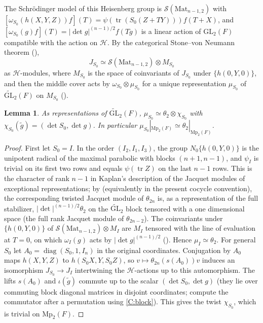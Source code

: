 \documentclass[11pt,oneside,notitlepage]{book}
\numberwithin{equation}{section}
\theoremstyle{plain}
\newtheorem{lemma}[theorem]{Lemma}
\theoremstyle{definition}
\newcommand{\GL}{\mathrm{GL}}
\newcommand{\Mp}{\mathrm{Mp}}
\newcommand{\Mat}{\mathrm{Mat}}
\newcommand{\cS}{\mathcal{S}}
\newcommand{\tGL}{\widetilde{\GL}}
\newcommand{\tr}{\operatorname{tr}}
\newcommand{\diag}{\operatorname{diag}}
\newcommand{\hil}[2]{(#1,#2)}
\begin{document}
The Schr\"odinger model of this Heisenberg group is $\cS(\Mat_{n-1,2})$ with $[\omega_{S_0}(h(X,Y,Z))f](T)=\psi(\tr(S_0(Z+TY)))f(T+X)$, and $[\omega_{S_0}(g)f](T)=|\det g|^{(n-1)/2}f(Tg)$ is a linear action of $\GL_2(F)$ compatible with the action on $\mathcal H$. By the categorical Stone--von Neumann theorem (),
\[J_{S_0}\simeq\cS(\Mat_{n-1,2})\otimes M_{S_0}\]
as $\mathcal H$-modules, where $M_{S_0}$ is the space of coinvariants of $J_{S_0}$ under $\{h(0,Y,0)\}$, and then the middle cover acts by $\omega_{S_0}\otimes\mu_{S_0}$ for a unique representation $\mu_{S_0}$ of $\tGL_2(F)$ on $M_{S_0}$ ().

\begin{lemma}\label{lem:Mmodule}
	As representations of $\tGL_2(F)$, $\mu_{S_0}\simeq\theta_2\otimes\chi_{S_0}$ with $\chi_{S_0}(\tilde g)=\hil{\det S_0}{\det g}$. In particular $\mu_{S_0}|_{\Mp_2(F)}\simeq\theta_2|_{\Mp_2(F)}$.
\end{lemma}
\begin{proof}
	First let $S_0=I$. In the order $(I_2,I_1,I_3)$, the group $N_0\{h(0,Y,0)\}$ is the unipotent radical of the maximal parabolic with blocks $(n+1,n-1)$, and $\psi_{I}$ is trivial on its first two rows and equals $\psi(\tr Z)$ on the last $n-1$ rows. This is the character of rank $n-1$ in Kaplan's description of the Jacquet modules of exceptional representations; by \cite[Theorem 3.3]{Kaplan} (equivalently \cite[Theorem 4.5]{KM} in the present cocycle convention), the corresponding twisted Jacquet module of $\theta_{2n}$ is, as a representation of the full stabilizer, $|\det|^{(n-1)/2}\theta_2$ on the $\tGL_2$ block tensored with a one dimensional space (the full rank Jacquet module of $\theta_{2n-2}$). The coinvariants under $\{h(0,Y,0)\}$ of $\cS(\Mat_{n-1,2})\otimes M_I$ are $M_I$ tensored with the line of evaluation at $T=0$, on which $\omega_I(g)$ acts by $|\det g|^{(n-1)/2}$ (). Hence $\mu_I\simeq\theta_2$. For general $S_0$ let $A_0=\diag(S_0,1,I_n)$ in the original coordinates. Conjugation by $A_0$ maps $h(X,Y,Z)$ to $h(S_0X,Y,S_0Z)$, so $v\mapsto\theta_{2n}(s(A_0))v$ induces an isomorphism $J_{S_0}\to J_I$ intertwining the $\mathcal H$-actions up to this automorphism. The lifts $s(A_0)$ and $\iota(\tilde g)$ commute up to the scalar $\hil{\det S_0}{\det g}$ (they lie over commuting block diagonal matrices in disjoint coordinates; compute the commutator after a permutation using \ref{C:block}). This gives the twist $\chi_{S_0}$, which is trivial on $\Mp_2(F)$.
\end{proof}
\end{document}
